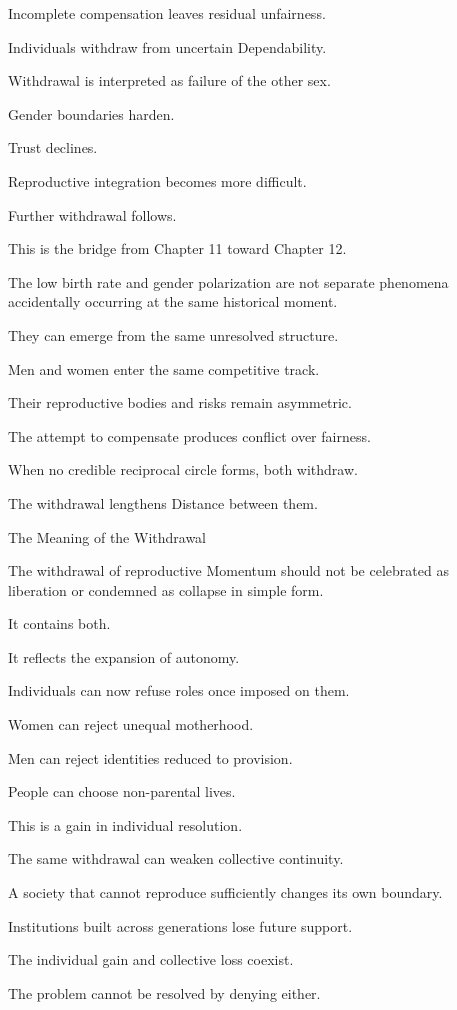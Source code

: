 Incomplete compensation leaves residual unfairness.

Individuals withdraw from uncertain Dependability.

Withdrawal is interpreted as failure of the other sex.

Gender boundaries harden.

Trust declines.

Reproductive integration becomes more difficult.

Further withdrawal follows.

This is the bridge from Chapter 11 toward Chapter 12.

The low birth rate and gender polarization are not separate phenomena accidentally occurring at the same historical moment.

They can emerge from the same unresolved structure.

Men and women enter the same competitive track.

Their reproductive bodies and risks remain asymmetric.

The attempt to compensate produces conflict over fairness.

When no credible reciprocal circle forms, both withdraw.

The withdrawal lengthens Distance between them.

The Meaning of the Withdrawal

The withdrawal of reproductive Momentum should not be celebrated as liberation or condemned as collapse in simple form.

It contains both.

It reflects the expansion of autonomy.

Individuals can now refuse roles once imposed on them.

Women can reject unequal motherhood.

Men can reject identities reduced to provision.

People can choose non-parental lives.

This is a gain in individual resolution.

The same withdrawal can weaken collective continuity.

A society that cannot reproduce sufficiently changes its own boundary.

Institutions built across generations lose future support.

The individual gain and collective loss coexist.

The problem cannot be resolved by denying either.

